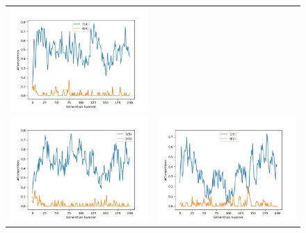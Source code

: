 \documentclass{article}
\begin{document}
\begin{figure}[H]
\begin{adjustbox}{width=0.6\paperwidth}
\begin{tabular}{c c}
				\includegraphics{Codes/Problem_1 Construction_1/Comp_4.jpg} \\ \includegraphics{Codes/Problem_1 Construction_1/Comp_5.jpg} &
				\includegraphics{Codes/Problem_1 Construction_1/Comp_6.jpg}\\

\end{tabular}
\end{adjustbox}
\end{figure}
\end{document}
